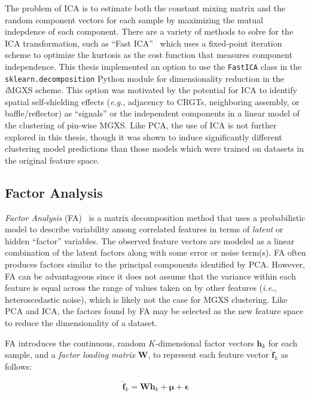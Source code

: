 The problem of ICA is to estimate both the constant mixing matrix and the random component vectors for each sample by maximizing the mutual indepdence of each component. There are a variety of methods to solve for the ICA transformation, such as ``Fast ICA''~\cite{hyvarinen1999fastica} which uses a fixed-point iteration scheme to optimize the kurtosis as the cost function that measures component independence. This thesis implemented an option to use the \texttt{FastICA} class in the \texttt{sklearn.decomposition} Python module for dimensionality reduction in the \textit{i}\ac{MGXS} scheme. This option was motivated by the potential for ICA to identify spatial self-shielding effects (\textit{e.g.}, adjacency to \acp{CRGT}, neighboring assembly, or baffle/reflector) as ``signals'' or the independent components in a linear model of the clustering of pin-wise \ac{MGXS}. Like PCA, the use of ICA is not further explored in this thesis, though it was shown to induce significantly different clustering model predictions than those models which were trained on datasets in the original feature space.

\subsection{Factor Analysis}
\label{subsec:chap10-factor-analysis}

\textit{Factor Analysis} (FA)~\cite{harman1960factor} is a matrix decomposition method that uses a probabilistic model to describe variability among correlated features in terms of \textit{latent} or hidden ``factor'' variables. The observed feature vectors are modeled as a linear combination of the latent factors along with some error or noise term(s). FA often produces factors similar to the principal components identified by PCA. However, FA can be advantageous since it does not assume that the variance within each feature is equal across the range of values taken on by other features (\textit{i.e.}, heteroscedastic noise), which is likely not the case for \ac{MGXS} clustering. Like PCA and ICA, the factors found by FA may be selected as the new feature space to reduce the dimensionality of a dataset.

FA introduces the continuous, random $K$-dimensional factor vectors $\boldsymbol{h}_{k}$ for each sample, and a \textit{factor loading matrix} $\boldsymbol{W}$, to represent each feature vector $\boldsymbol{\hat{f}}_{k}$ as follows:

\begin{equation}
\label{eqn:chap10-fa-project}
\boldsymbol{\hat{f}}_{k} = \boldsymbol{W}\boldsymbol{h}_{k} + \boldsymbol{\mu} + \boldsymbol{\epsilon}
\end{equation}

